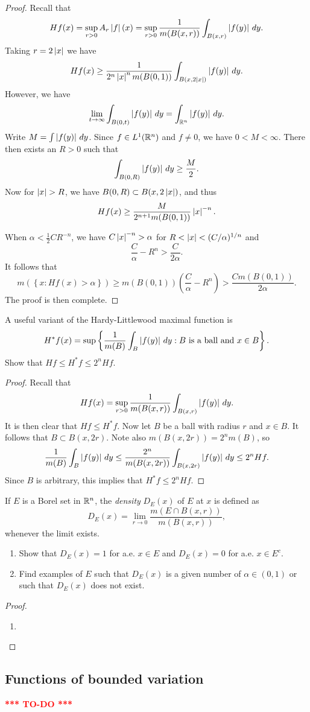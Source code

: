 \documentclass[a4paper]{article}
\newcommand{\TODO}{\textcolor{red}{\textbf{*** TO-DO ***}}}
\begin{document}
\begin{proof}
Recall that 
\[
H f (x) 
= \sup_{r > 0} A_r \left\lvert f\right\rvert (x)
= \sup_{r > 0} \frac{1}{m( B(x, r) )} \int_{B(x, r)} \left\lvert f(y)\right\rvert
\, d y.
\]
Taking $r = 2 \left\lvert x\right\rvert$ we have 
\[
\begin{aligned}
H f (x)
\geq \frac{1}{2^n \left\lvert x\right\rvert^n m( B(0, 1) )} 
\int_{B(x, 2 \left\lvert x\right\rvert)} \left\lvert f(y)\right\rvert \, d y. 
\end{aligned}
\]
However, we have 
\[
\lim_{t \to \infty} \int_{B(0, t)} \left\lvert f(y)\right\rvert \, d y 
= \int_{\mathbb{R}^n} \left\lvert f(y)\right\rvert \, d y.
\]
Write $M = \int \left\lvert f(y)\right\rvert \, d y$. Since $f \in L^1 (\mathbb{R}^n)$
and $f \neq 0$, we have $0 < M < \infty$. There then 
exists an $R > 0$ such that 
\[
\int_{ B(0, R) } \left\lvert f(y)\right\rvert \, d y \geq \frac{M}{2}.
\]
Now for $\left\lvert x\right\rvert > R$, we have $B(0, R) \subset B(x, 2 \left\lvert x\right\rvert)$,
and thus 
\[
H f(x) \geq \frac{M}{2^{n + 1} m( B(0, 1) )} \left\lvert x\right\rvert^{-n}.
\]

When $\alpha < \frac{1}{2} C R^{-n}$, we have 
$C \left\lvert x\right\rvert^{-n} > \alpha$ for $R < \left\lvert x\right\rvert < (C / \alpha)^{1 / n}$
and
\[
\frac{C}{\alpha} - R^n > \frac{C}{2 \alpha}.
\]
It follows that 
\[
m (\left\{ x : H f(x) > \alpha \right\})
\geq m( B(0, 1) ) \left( \frac{C}{\alpha} - R^n \right)
> \frac{C m ( B(0, 1) )}{2 \alpha}.
\]
The proof is then complete.
\end{proof}

\begin{ex}[Folland 3.23]
A useful variant of the Hardy-Littlewood maximal function is 
\[
H^* f(x) = \sup \left\{  \frac{1}{m(B)} \int_B \left\lvert f(y)\right\rvert
\, d y : \text{$B$ is a ball and $x \in B$} \right\}.
\]
Show that $H f \leq H^* f \leq 2^n H f$.
\end{ex}

\begin{proof}
Recall that 
\[
H f(x) = \sup_{r > 0} \frac{1}{m (B(x, r))} 
\int_{B(x, r)} \left\lvert f(y)\right\rvert \, d y.
\]
It is then clear that $Hf \leq H^* f$. Now let $B$ be a ball
with radius $r$ and $x \in B$. It follows that 
$B \subset B(x, 2r)$. Note also $m(B(x, 2r)) = 2^n m(B)$, so
\[
\frac{1}{m(B)} \int_B \left\lvert f(y)\right\rvert \, d y 
\leq \frac{2^n}{m( B(x, 2r) )} \int_{ B(x, 2r) } \left\lvert f(y)\right\rvert \, d y
\leq 2^n H f.
\]
Since $B$ is arbitrary, this implies that $H^* f \leq 2^n H f$.
\end{proof}

\begin{ex}[Follan 3.25]
If $E$ is a Borel set in $\mathbb{R}^n$, the \emph{density} $D_E(x)$ of $E$ 
at $x$ is defined as 
\[
D_E (x) = \lim_{r \to 0} \frac{m(E \cap B(x, r))}{m(B(x, r))},
\]
whenever the limit exists.

\begin{enumerate}
\item Show that $D_E (x) = 1$ for a.e. $x \in E$ and 
$D_E (x) = 0$ for a.e. $x \in E^c$.
\item Find examples of $E$ such that $D_E(x)$ is a given number 
of $\alpha \in (0, 1)$ or such that $D_E(x)$ does not exist.
\end{enumerate}
\end{ex}

\begin{proof}
\begin{enumerate}
\item 
\end{enumerate}
\end{proof}

\subsection{Functions of bounded variation}
\TODO
\end{document}
